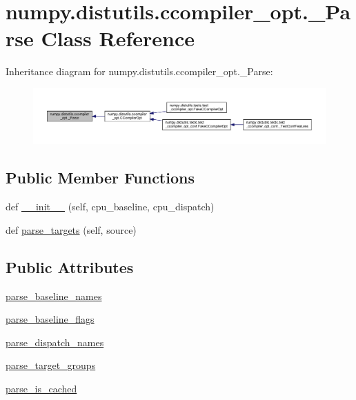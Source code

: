 \hypertarget{classnumpy_1_1distutils_1_1ccompiler__opt_1_1__Parse}{}\section{numpy.\+distutils.\+ccompiler\+\_\+opt.\+\_\+\+Parse Class Reference}
\label{classnumpy_1_1distutils_1_1ccompiler__opt_1_1__Parse}


Inheritance diagram for numpy.\+distutils.\+ccompiler\+\_\+opt.\+\_\+\+Parse\+:
\nopagebreak
\begin{figure}[H]
\begin{center}
\leavevmode
\includegraphics[width=350pt]{classnumpy_1_1distutils_1_1ccompiler__opt_1_1__Parse__inherit__graph}
\end{center}
\end{figure}
\subsection*{Public Member Functions}
\begin{DoxyCompactItemize}
\item 
def \hyperlink{classnumpy_1_1distutils_1_1ccompiler__opt_1_1__Parse_a3e565e0727ad1875f0ecb204c8e36fac}{\+\_\+\+\_\+init\+\_\+\+\_\+} (self, cpu\+\_\+baseline, cpu\+\_\+dispatch)
\item 
def \hyperlink{classnumpy_1_1distutils_1_1ccompiler__opt_1_1__Parse_a1b04ad8127ca1410e8be8576623edd88}{parse\+\_\+targets} (self, source)
\end{DoxyCompactItemize}
\subsection*{Public Attributes}
\begin{DoxyCompactItemize}
\item 
\hyperlink{classnumpy_1_1distutils_1_1ccompiler__opt_1_1__Parse_a767db7f9d758235c2461bba1cafd22ad}{parse\+\_\+baseline\+\_\+names}
\item 
\hyperlink{classnumpy_1_1distutils_1_1ccompiler__opt_1_1__Parse_a39f95ce69d4a9772908a63d85cd27d39}{parse\+\_\+baseline\+\_\+flags}
\item 
\hyperlink{classnumpy_1_1distutils_1_1ccompiler__opt_1_1__Parse_a5c0be4f27207645e10900632684c2865}{parse\+\_\+dispatch\+\_\+names}
\item 
\hyperlink{classnumpy_1_1distutils_1_1ccompiler__opt_1_1__Parse_ac8c64bd8c62e47553c630f798d8c1f60}{parse\+\_\+target\+\_\+groups}
\item 
\hyperlink{classnumpy_1_1distutils_1_1ccompiler__opt_1_1__Parse_abc52c0e3997d7a9ad6df4a34120b4ef5}{parse\+\_\+is\+\_\+cached}
\end{DoxyCompactItemize}


